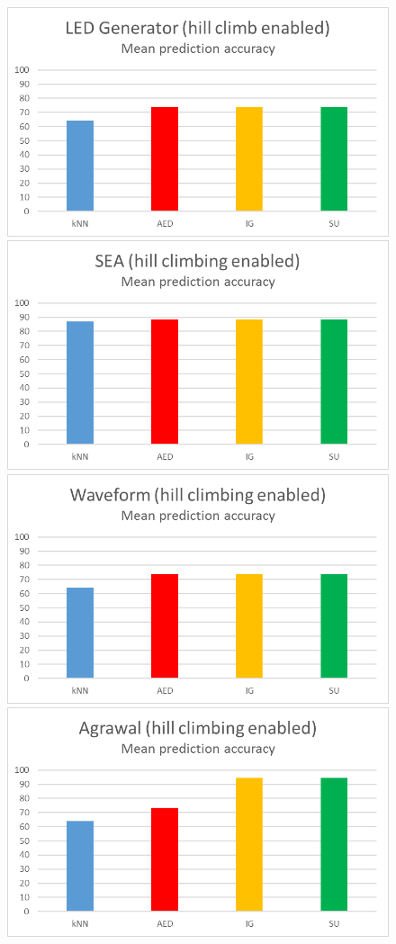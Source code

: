 \begin{figure}[hp]
\centering
\includegraphics[scale=0.17]{Graphs/LED/H_bar}
\includegraphics[scale=0.17]{Graphs/SEA/H_bar}
\includegraphics[scale=0.17]{Graphs/Waveform/H_bar}
\includegraphics[scale=0.17]{Graphs/Agrawal/H_bar}

\end{figure}
